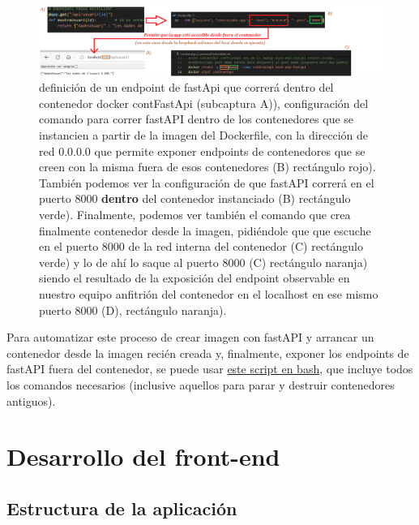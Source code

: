 \documentclass[a4paper,12pt]{report}
\begin{document}
	\FloatBarrier
	\begin{figure}[H]
		\centering
		\caption{definición de un endpoint de fastApi que correrá dentro del contenedor docker contFastApi (subcaptura A)), configuración del comando para correr fastAPI dentro de los contenedores que se instancien a partir de la imagen del Dockerfile, con la dirección de red 0.0.0.0 que permite exponer endpoints de contenedores que se creen con la misma fuera de esos contenedores (B) rectángulo rojo). También podemos ver la configuración de que fastAPI correrá en el puerto 8000 \textbf{dentro} del contenedor instanciado (B) rectángulo verde). Finalmente, podemos ver también el comando que crea finalmente contenedor desde la imagen, pidiéndole que que escuche en el puerto 8000 de la red interna del contenedor (C) rectángulo verde) y lo de ahí lo saque al puerto 8000 (C) rectángulo naranja) siendo el resultado de la exposición del endpoint observable en nuestro equipo anfitrión del contenedor en el localhost en ese mismo puerto 8000 (D), rectángulo naranja).}
		\label{fig:demofastapiendpointdummy}
		\includegraphics[width=1\linewidth]{img/demoFastApiEndpointDummy}
	\end{figure}
	\FloatBarrier
	
	Para automatizar este proceso de crear imagen con fastAPI y arrancar un contenedor desde la imagen recién creada y, finalmente, exponer los endpoints de fastAPI fuera del contenedor, se puede usar \href{https://github.com/blackcub3s/mercApp/blob/main/APP%20WEB/__FastAPI__/creaImatge_i_arrancaContenidor.sh}{este script en bash}, que incluye todos los comandos necesarios (inclusive aquellos para parar y destruir contenedores antiguos).
	
	
	
	
	
	
	
	
	\section{Desarrollo del front-end}
	
	\subsection{Estructura de la aplicación}
	\label{sec:estructuraAplicacionFrontEnd}
	
\end{document}
